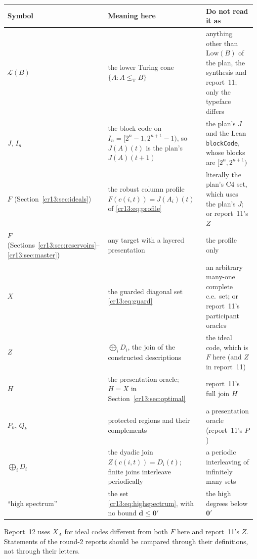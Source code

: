 \documentclass[11pt,letterpaper]{article}
\theoremstyle{definition}
\theoremstyle{remark}\newtheorem{remark}[theorem]{Remark}
\numberwithin{equation}{section}
\newcommand{\leT}{\leq_{\mathrm T}}
\newcommand{\Low}{\mathcal L}
\newcommand{\zero}{\mathbf 0}
\begin{document}
\begin{center}\small
\begin{tabularx}{\textwidth}{@{}>{\raggedright\arraybackslash}p{}>{\raggedright\arraybackslash}X>{\raggedright\arraybackslash}X@{}}
\toprule
Symbol & Meaning here & Do not read it as\\\midrule
$\Low(B)$ & the lower Turing cone $\{A:A\leT B\}$ & anything other than $\mathrm{Low}(B)$ of the plan, the synthesis and report~11; only the typeface differs\\
$J$, $I_n$ & the block code on $I_n=[2^n-1,2^{n+1}-1)$, so $J(A)(t)$ is the plan's $J(A)(t+1)$ & the plan's $J$ and the Lean \texttt{blockCode}, whose blocks are $[2^n,2^{n+1})$\\
$F$ (Section~\ref{cr13:sec:ideals}) & the robust column profile $F(c(i,t))=J(A_i)(t)$ of \eqref{cr13:eq:profile} & literally the plan's C4 set, which uses the plan's $J$; or report~11's $Z$\\
$F$ (Sections~\ref{cr13:sec:reservoirs}--\ref{cr13:sec:master}) & any target with a layered presentation & the profile only\\
$X$ & the guarded diagonal set \eqref{cr13:eq:guard} & an arbitrary many-one complete c.e.\ set; or report~11's participant oracles\\
$Z$ & $\bigoplus_iD_i$, the join of the constructed descriptions & the ideal code, which is $F$ here (and $Z$ in report~11)\\
$H$ & the presentation oracle; $H=X$ in Section~\ref{cr13:sec:optimal} & report~11's full join $H$\\
$P_k$, $Q_k$ & protected regions and their complements & a presentation oracle (report~11's $P$)\\
$\bigoplus_iD_i$ & the dyadic join $Z(c(i,t))=D_i(t)$; finite joins interleave periodically & a periodic interleaving of infinitely many sets\\
``high spectrum'' & the set \eqref{cr13:eq:highspectrum}, with no bound $\mathbf d\le\zero'$ & the high degrees below $\zero'$\\
\bottomrule
\end{tabularx}
\end{center}
Report~12 uses $X_A$ for ideal codes different from both $F$ here and report~11's $Z$. Statements of the round-2 reports should be compared through their definitions, not through their letters.
\end{document}
